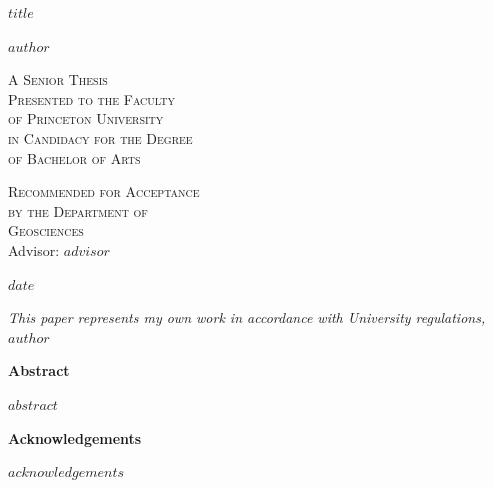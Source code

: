 \documentclass[11pt]{report}
\begin{document}

\thispagestyle{empty}
  \begin{center}
    \textsc{\LARGE $title$} %
  \end{center}
  \vspace{.6in}
  \begin{center}
    $author$
  \end{center}
  \vspace{.6in}
  \begin{center}
    \textsc{A Senior Thesis \\ %
    Presented to the Faculty \\
    of Princeton University \\
    in Candidacy for the Degree \\
    of Bachelor of Arts}
  \end{center}
  \vspace{.3in}
  \begin{center}
    \textsc{Recommended for Acceptance \\
    by the Department of \\
    Geosciences \\}
    Advisor: $advisor$ %
  \end{center}
  \vspace{.3in}
  \begin{center}
    $date$ %
  \end{center}
  
  \clearpage

\thispagestyle{empty}
\vspace*{3in}
\begin{center}
\emph{This paper represents my own work in accordance with University regulations,} \\
$author$
\end{center}
\clearpage

{}
\begin{center}
\Large \textbf{Abstract}
\end{center}
 $abstract$
 \clearpage

{}
\begin{center}
\Large \textbf{Acknowledgements}
\end{center}
$acknowledgements$
\clearpage
\end{document}
